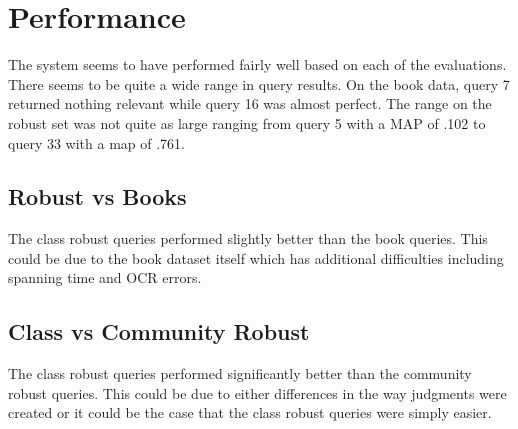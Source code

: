 \documentclass[paper=a4, fontsize=11pt]{scrartcl} %
\numberwithin{equation}{section} %
\numberwithin{figure}{section} %
\numberwithin{table}{section} %
\begin{document}
\section {Performance}
The system seems to have performed fairly well based on each of the evaluations. There seems to be quite a wide range in query results. On the book data, query 7 returned nothing relevant while query 16 was almost perfect. The range on the robust set was not quite as large ranging from query 5 with a MAP of .102 to query 33 with a map of .761.

\subsection {Robust vs Books}
The class robust queries performed slightly better than the book queries. This could be due to the book dataset itself which has additional difficulties including spanning time and OCR errors.

\subsection {Class vs Community Robust}
The class robust queries performed significantly better than the community robust queries. This could be due to either differences in the way judgments were created or it could be the case that the class robust queries were simply easier.
\end{document}
